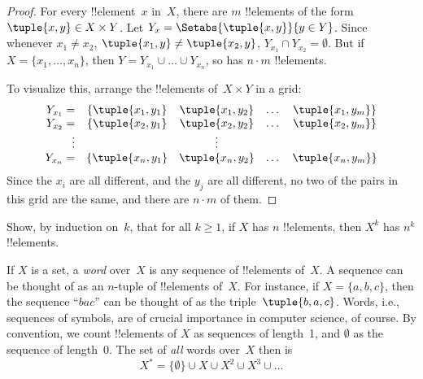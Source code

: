 \documentclass[../../../include/open-logic-section]{subfiles}
\begin{document}
\begin{proof}
For every !!{element}~$x$ in~$X$, there are $m$ !!{element}s of the
form $\tuple{x, y} \in X \times Y$. Let $Y_x = \Setabs{\tuple{x, y}}{y
  \in Y}$. Since whenever $x_1 \neq x_2$, $\tuple{x_1, y} \neq
\tuple{x_2, y}$, $Y_{x_1} \cap Y_{x_2} = \emptyset$. But if $X = \{x_1,
\dots, x_n\}$, then $Y = Y_{x_1} \cup \dots \cup Y_{x_n}$, so has
$n\cdot m$ !!{element}s.

To visualize this, arrange the !!{element}s of~$X \times Y$ in a grid:
\[
\begin{array}{rcccc}
  Y_{x_1} = & \{\tuple{x_1, y_1} & \tuple{x_1, y_2} & \dots & \tuple{x_1, y_m}\}\\
  Y_{x_2} = & \{\tuple{x_2, y_1} & \tuple{x_2, y_2} & \dots & \tuple{x_2, y_m}\}\\
  \vdots & & \vdots\\
  Y_{x_n} = & \{\tuple{x_n, y_1} & \tuple{x_n, y_2} & \dots & \tuple{x_n, y_m}\}
\end{array}
\]
Since the $x_i$ are all different, and the $y_j$ are all different, no
two of the pairs in this grid are the same, and there are $n\cdot m$
of them.
\end{proof}

\begin{prob}
Show, by induction on~$k$, that for all $k \ge 1$, if $X$ has $n$
!!{element}s, then $X^k$ has $n^k$ !!{element}s.
\end{prob}

\begin{ex}
If $X$ is a set, a \emph{word} over~$X$ is any sequence of
!!{element}s of~$X$. A sequence can be thought of as an $n$-tuple of
!!{element}s of~$X$. For instance, if $X = \{a, b, c\}$, then the
sequence ``$bac$'' can be thought of as the triple~$\tuple{b, a, c}$.
Words, i.e., sequences of symbols, are of crucial importance in
computer science, of course. By convention, we count !!{element}s of
$X$ as sequences of length~1, and $\emptyset$ as the sequence of
length~0. The set of \emph{all} words over~$X$ then is
\[
X^* = \{\emptyset\} \cup X \cup X^2 \cup X^3 \cup \dots
\]
\end{ex}
\end{document}
